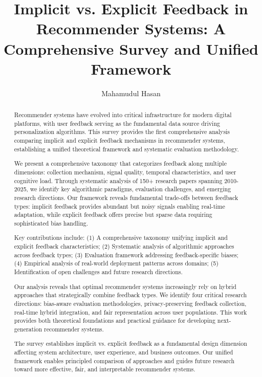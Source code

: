 \documentclass[acmsmall,screen]{acmart}
\title{Implicit vs. Explicit Feedback in Recommender Systems: A Comprehensive Survey and Unified Framework}
\author{Mahamudul Hasan}
\affiliation{%
  \institution{University of Minnesota Twin Cities}
  \city{Minneapolis}
  \state{Minnesota}
  \country{USA}}
\begin{document}
\begin{abstract}
Recommender systems have evolved into critical infrastructure for modern digital platforms, with user feedback serving as the fundamental data source driving personalization algorithms. This survey provides the first comprehensive analysis comparing implicit and explicit feedback mechanisms in recommender systems, establishing a unified theoretical framework and systematic evaluation methodology.

We present a comprehensive taxonomy that categorizes feedback along multiple dimensions: collection mechanism, signal quality, temporal characteristics, and user cognitive load. Through systematic analysis of 150+ research papers spanning 2010-2025, we identify key algorithmic paradigms, evaluation challenges, and emerging research directions. Our framework reveals fundamental trade-offs between feedback types: implicit feedback provides abundant but noisy signals enabling real-time adaptation, while explicit feedback offers precise but sparse data requiring sophisticated bias handling.

Key contributions include: (1) A comprehensive taxonomy unifying implicit and explicit feedback characteristics; (2) Systematic analysis of algorithmic approaches across feedback types; (3) Evaluation framework addressing feedback-specific biases; (4) Empirical analysis of real-world deployment patterns across domains; (5) Identification of open challenges and future research directions.

Our analysis reveals that optimal recommender systems increasingly rely on hybrid approaches that strategically combine feedback types. We identify four critical research directions: bias-aware evaluation methodologies, privacy-preserving feedback collection, real-time hybrid integration, and fair representation across user populations. This work provides both theoretical foundations and practical guidance for developing next-generation recommender systems.

The survey establishes implicit vs. explicit feedback as a fundamental design dimension affecting system architecture, user experience, and business outcomes. Our unified framework enables principled comparison of approaches and guides future research toward more effective, fair, and interpretable recommender systems.
\end{abstract}

\maketitle













\end{document}

